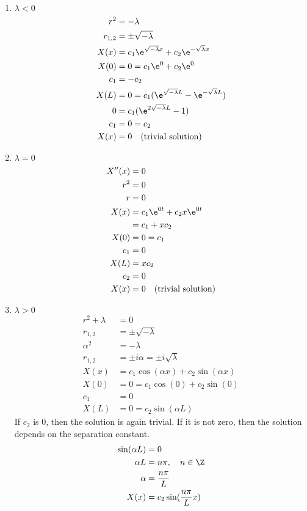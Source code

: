 \documentclass{math}
\begin{document}
\begin{enumerate}
  \item \( \lambda < 0 \)
  \begin{align*}
    r^2 &= -\lambda \\
    r_{1,2} &= \pm\sqrt{-\lambda} \\
    X(x) &= c_1\e^{\sqrt{-\lambda}x}+c_2\e^{-\sqrt{\lambda}x} \\
    X(0) &= 0 = c_1\e^{0}+c_2\e^{0} \\
    c_1 &= -c_2 \\
    X(L) &= 0 = c_1(\e^{\sqrt{-\lambda}L}-\e^{-\sqrt{\lambda}L}) \\
    0 &= c_1(\e^{2\sqrt{-\lambda}L}-1) \\
    c_1 &= 0 = c_2 \\
    X(x) &= 0 \quad \text{(trivial solution)}
  \end{align*}
  \item \( \lambda = 0 \)
  \begin{align*}
    X''(x) &= 0 \\
    r^2 &= 0 \\
    r &= 0 \\
    X(x) &= c_1\e^{0t}+c_2x\e^{0t} \\
    &= c_1+xc_2 \\
    X(0) &= 0 = c_1 \\
    c_1 &= 0 \\
    X(L) &= xc_2 \\
    c_2 &= 0 \\
    X(x) &= 0 \quad \text{(trivial solution)}
  \end{align*}
  \item \( \lambda > 0 \)
  \begin{align*}
    r^2+\lambda &= 0 \\
    r_{1,2} &= \pm\sqrt{-\lambda} \\
    \alpha^2 &= -\lambda \\
    r_{1,2} &= \pm i\alpha = \pm i\sqrt{\lambda} \\
    X(x) &= c_1\cos(\alpha x)+c_2\sin(\alpha x) \\
    X(0) &= 0 = c_1\cos(0)+c_2\sin(0) \\
    c_1 &= 0 \\
    X(L) &= 0 = c_2\sin(\alpha L)
  \end{align*}
  If \( c_2 \) is 0, then the solution is again trivial. If it is not zero,
  then the solution depends on the separation constant.
  \begin{align*}
    \sin(\alpha L) &= 0 \\
    \alpha L &= n\pi, \quad n\in\Z \\
    \alpha &= \frac{n\pi}{L} \\
    X(x) &= c_2\sin(\frac{n\pi}{L}x)
  \end{align*}
\end{enumerate}
\end{document}
